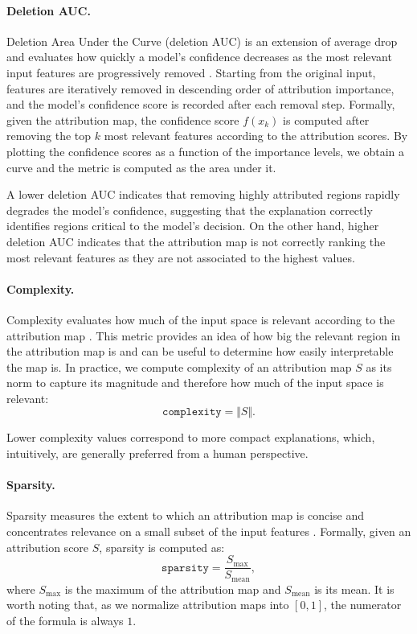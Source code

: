 \paragraph{Deletion AUC.}
Deletion Area Under the Curve (deletion AUC) is an extension of average drop and evaluates how quickly a model’s confidence decreases as the most relevant input features are progressively removed \cite{deletion_auc}. Starting from the original input, features are iteratively removed in descending order of attribution importance, and the model’s confidence score is recorded after each removal step. Formally, given the attribution map, the confidence score $f(x_k)$ is computed after removing the top $k$ most relevant features according to the attribution scores. By plotting the confidence scores as a function of the importance levels, we obtain a curve and the metric is computed as the area under it.

A lower deletion AUC indicates that removing highly attributed regions rapidly degrades the model’s confidence, suggesting that the explanation correctly identifies regions critical to the model’s decision. On the other hand, higher deletion AUC indicates that the attribution map is not correctly ranking the most relevant features as they are not associated to the highest values.


\paragraph{Complexity.} Complexity evaluates how much of the input space is relevant according to the attribution map \cite{complexity_metric}. This metric provides an idea of how big the relevant region in the attribution map is and can be useful to determine how easily interpretable the map is. In practice, we compute complexity of an attribution map $S$ as its norm to capture its magnitude and therefore how much of the input space is relevant:
\begin{equation}
    \texttt{complexity} = \Vert S \Vert.
\end{equation}

Lower complexity values correspond to more compact explanations, which, intuitively, are generally preferred from a human perspective.


\paragraph{Sparsity.} Sparsity measures the extent to which an attribution map is concise and concentrates relevance on a small subset of the input features \cite{sparsity_metric}. Formally, given an attribution score $S$, sparsity is computed as:
\begin{equation}
    \texttt{sparsity} = \frac{S_\text{max}}{S_\text{mean}},
\end{equation}
where $S_\text{max}$ is the maximum of the attribution map and $S_\text{mean}$ is its mean. It is worth noting that, as we normalize attribution maps into $[0, 1]$, the numerator of the formula is always $1$.

